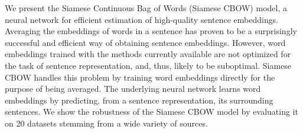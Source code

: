 We present the Siamese Continuous Bag of Words (Siamese CBOW) model, a neural network for efficient estimation of high-quality sentence embeddings. Averaging the embeddings of words in a sentence has proven to be a surprisingly successful and efficient way of obtaining sentence embeddings. However, word embeddings trained with the methods currently available are not optimized for the task of sentence representation, and, thus, likely to be suboptimal. Siamese CBOW handles this problem by training word embeddings directly for the purpose of being averaged. The underlying neural network learns word embeddings by predicting, from a sentence representation, its surrounding sentences. We show the robustness of the Siamese CBOW model by evaluating it on 20 datasets stemming from a wide variety of sources.
